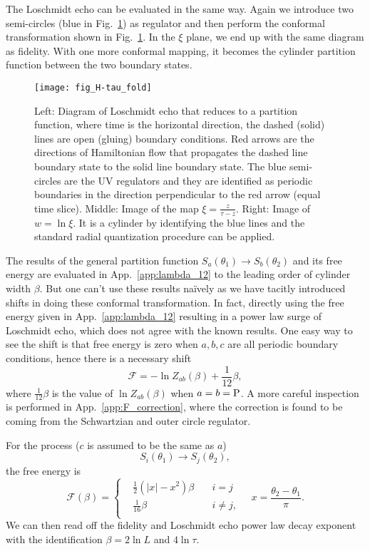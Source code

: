 The Loschmidt echo can be evaluated in the same way. Again we introduce two semi-circles (blue in Fig.~\ref{fig:H-tau_fold}) as regulator and then perform the conformal transformation shown in Fig.~\ref{fig:H-tau_fold}. In the $\xi$ plane, we end up with the same diagram as fidelity. With one more conformal mapping, it becomes the cylinder partition function between the two boundary states. 

\begin{figure}[htb]
\centering
\texttt{[image: fig\_H-tau\_fold]}
\caption{Left: Diagram of Loschmidt echo that reduces to a partition function, where time is the horizontal direction, the dashed (solid) lines are open (gluing) boundary conditions. Red arrows are the directions of Hamiltonian flow that propagates the dashed line boundary state to the solid line boundary state. The blue semi-circles are the UV regulators and they are identified as periodic boundaries in the direction perpendicular to the red arrow (equal time slice). Middle: Image of the map $\xi = \frac{z}{\tau - z}$. Right: Image of $w = \ln \xi$. It is a cylinder by identifying the blue lines and the standard radial quantization procedure can be applied. }
\label{fig:H-tau_fold}
\end{figure}

The results of the general partition function $S_a( \theta_1 ) \rightarrow S_b( \theta_2)$ and its free energy are evaluated in App.~\ref{app:lambda_12} to the leading order of cylinder width $\beta$. But one can't use these results na\"ively as we have tacitly introduced shifts in doing these conformal transformation. In fact, directly using the free energy given in App.~\ref{app:lambda_12} resulting in a power law surge of Loschmidt echo, which does not agree with the known results. One easy way to see the shift is that free energy is zero when $a,b,c$ are all periodic boundary conditions, hence there is a necessary shift
\begin{equation}
\mathcal{F} = - \ln Z_{ab} ( \beta ) + \frac{1}{12} \beta ,
\end{equation}
where $\frac{1}{12}\beta$ is the value of $ \ln Z_{ab} ( \beta )$ when $a = b = {\rm P}$. A more careful inspection is performed in App.~\ref{app:F_correction}, where the correction is found to be coming from the Schwartzian and outer circle regulator. 

For the process ($c$ is assumed to be the same as $a$)
\begin{equation}
S_i( \theta_1 ) \rightarrow S_j( \theta_2 ) ,
\end{equation}
the free energy is
\begin{equation}
\mathcal{F}( \beta )  = 
\left\lbrace
\begin{aligned}
  &\frac{1}{2}(|x| - x^2 )\beta  \quad &i = j \\
  &\frac{1}{16}\beta   \quad &i \ne j ,  \\
\end{aligned} \right. \quad x = \frac{\theta_2 - \theta_1}{\pi} .
\end{equation}
We can then read off the fidelity and Loschmidt echo power law decay exponent with the identification $\beta = 2 \ln L$ and $ 4 \ln \tau$. 

